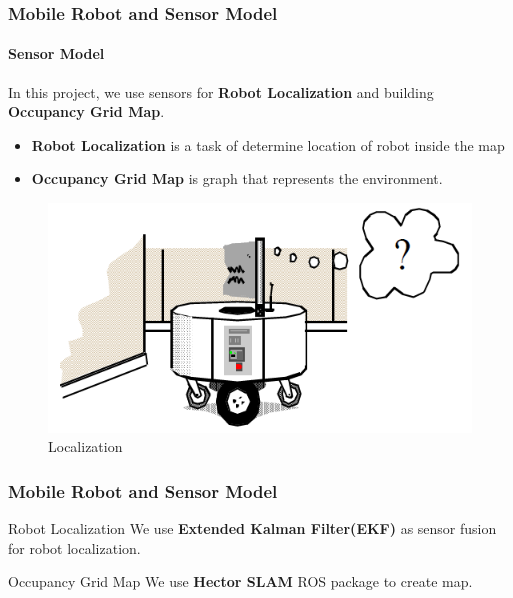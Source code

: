 \begin{frame}
	\frametitle{Mobile Robot and Sensor Model}
	\framesubtitle{Sensor Model}
	In this project, we use sensors for \textbf{Robot Localization} and building \textbf{Occupancy Grid Map}.
	\begin{itemize}
		\item<1-> \textbf{Robot Localization} is a task of determine location of robot inside the map
		\item<2-> \textbf{Occupancy Grid Map} is graph that represents the environment.
	\end{itemize}
	\begin{figure}
		\caption{Localization\footnotemark}
		\includegraphics[scale=0.3]{image/robot_wai.png}
	\end{figure}
\end{frame}




\begin{frame}
	\frametitle{Mobile Robot and Sensor Model}
	\begin{block}{Robot Localization}
		We use \textbf{Extended Kalman Filter(EKF)} as sensor fusion for robot localization.
	\end{block}
	\begin{block}{Occupancy Grid Map}
		We use \textbf{Hector SLAM} ROS package to create map.
	\end{block}
\end{frame}


